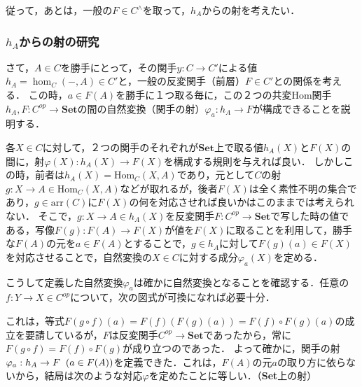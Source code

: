 \documentclass[uplatex, dvipdfmx]{jsreport}
\begin{document}
従って，あとは，一般の$F\in C^\wedge$を取って，$h_A$からの射を考えたい．

\subsubsection{$h_A$からの射の研究}

さて，$A\in C$を勝手にとって，その関手$y:C\to C'$による値$h_A=\hom_C(-,A) \in C'$と，一般の反変関手（前層）$F\in C'$との関係を考える．
この時，$a\in F(A)$を勝手に１つ取る毎に，この２つの共変Hom関手$h_A,F:C^{op}\to \mathbf{Set}$の間の自然変換（関手の射）$\varphi_a:h_A\to F$が構成できることを説明する．

各$X\in C$に対して，２つの関手のそれぞれが$\mathbf{Set}$上で取る値$h_A(X)$と$F(X)$の間に，射$\varphi (X):h_A(X)\to F(X)$を構成する規則を与えれば良い．
しかしこの時，前者は$h_A(X)=\mathrm{Hom}_C(X,A)$であり，元として$C$の射$g:X\to A \in \mathrm{Hom}_C(X,A)$などが取れるが，後者$F(X)$は全く素性不明の集合であり，$g\in\mathrm{arr}(C)$に$F(X)$の何を対応させれば良いかはこのままでは考えられない．
そこで，$g:X\to A\in h_A(X)$を反変関手$F:C^{op}\to\mathbf{Set}$で写した時の値である，写像$F(g):F(A)\to F(X)$が値を$F(X)$に取ることを利用して，勝手な$F(A)$の元を$a\in F(A)$とすることで，$g\in h_A$に対して$F(g)(a)\in F(X)$を対応させることで，自然変換の$X\in C$に対する成分$\varphi_a(X)$を定める．
\begin{center}\end{center}
こうして定義した自然変換$\varphi_a$は確かに自然変換となることを確認する．任意の$f:Y\to X\in C^{op}$について，次の図式が可換になれば必要十分．
\begin{center}\end{center}
これは，等式$F(g\circ f)(a)=F(f)(F(g)(a))=F(f)\circ F(g)(a)$の成立を要請しているが，$F$は反変関手$C^{op}\to\mathbf{Set}$であったから，常に$F(g\circ f)=F(f)\circ F(g)$が成り立つのであった．
よって確かに，関手の射$\varphi_a:h_A\to F\hspace{2mm}(a\in F(A))$を定義できた．これは，$F(A)$の元$a$の取り方に依らないから，結局は次のような対応$\varphi$を定めたことに等しい．（\textbf{Set}上の射）
\end{document}
